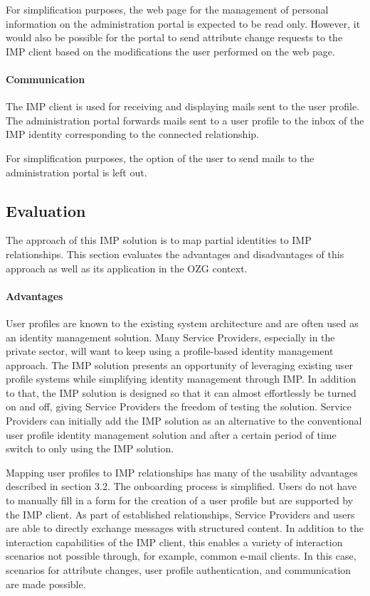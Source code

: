 For simplification purposes, the web page for the management of personal information on the administration portal is expected to be read only. However, it would also be possible for the portal to send attribute change requests to the IMP client based on the modifications the user performed on the web page.

\paragraph{Communication}

The IMP client is used for receiving and displaying mails sent to the user profile. The administration portal forwards mails sent to a user profile to the inbox of the IMP identity corresponding to the connected relationship.

For simplification purposes, the option of the user to send mails to the administration portal is left out.

\subsection{Evaluation}

The approach of this IMP solution is to map partial identities to IMP relationships. This section evaluates the advantages and disadvantages of this approach as well as its application in the OZG context.

\paragraph{Advantages}

User profiles are known to the existing system architecture and are often used as an identity management solution. Many Service Providers, especially in the private sector, will want to keep using a profile-based identity management approach. The IMP solution presents an opportunity of leveraging existing user profile systems while simplifying identity management through IMP. In addition to that, the IMP solution is designed so that it can almost effortlessly be turned on and off, giving Service Providers the freedom of testing the solution. Service Providers can initially add the IMP solution as an alternative to the conventional user profile identity management solution and after a certain period of time switch to only using the IMP solution.

Mapping user profiles to IMP relationships has many of the usability advantages described in section 3.2. The onboarding process is simplified. Users do not have to manually fill in a form for the creation of a user profile but are supported by the IMP client. As part of established relationships, Service Providers and users are able to directly exchange messages with structured content. In addition to the interaction capabilities of the IMP client, this enables a variety of interaction scenarios not possible through, for example, common e-mail clients. In this case, scenarios for attribute changes, user profile authentication, and communication are made possible.

